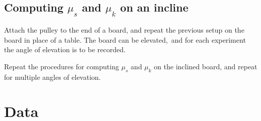 \documentclass[12pt]{article}
\begin{document}
        \subsection{Computing $\mu_s$ and $\mu_k$ on an incline}
            \par Attach the pulley to the end of a board, and repeat the previous 
            setup on the board in place of a table. The board can be elevated,\
            and for each experiment the angle of elevation is to be recorded.
            \par Repeat the procedures for computing $\mu_s$ and $\mu_k$ on the
            inclined board, and repeat for multiple angles of elevation.
    \section{Data}
       
\end{document}
